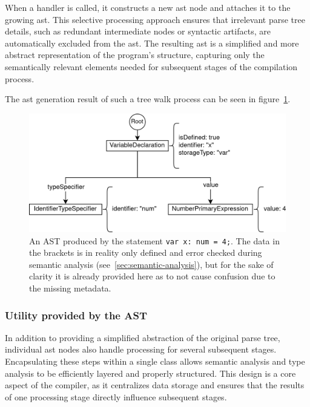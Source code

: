 When a handler is called, it constructs a new \acrshort{ast} node and attaches it to the growing \acrshort{ast}. This selective processing approach ensures that irrelevant parse tree details, such as redundant intermediate nodes or syntactic artifacts, are automatically excluded from the \acrshort{ast}. The resulting \acrshort{ast} is a simplified and more abstract representation of the program's structure, capturing only the semantically relevant elements needed for subsequent stages of the compilation process.

The \acrshort{ast} generation result of such a tree walk process can be seen in figure~\ref{fig:implementation:ast}.

\begin{figure}[h!]
	\centering
	\includegraphics[scale=1]{./pics/AST.drawio}
	\caption{An AST produced by the statement \lstinline|var x: num = 4;|. The data in the brackets is in reality only defined and error checked during semantic analysis (see~\ref{sec:semantic-analysis}), but for the sake of clarity it is already provided here as to not cause confusion due to the missing metadata.}
	\label{fig:implementation:ast}
\end{figure}

\subsubsection{Utility provided by the AST}

In addition to providing a simplified abstraction of the original parse tree, individual \acrshort{ast} nodes also handle processing for several subsequent stages. Encapsulating these steps within a single class allows semantic analysis and type analysis to be efficiently layered and properly structured. This design is a core aspect of the compiler, as it centralizes data storage and ensures that the results of one processing stage directly influence subsequent stages.

